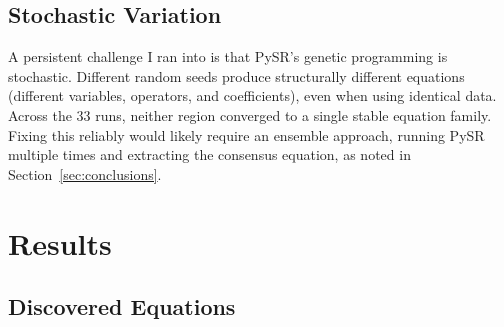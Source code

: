 \documentclass[12pt, a4paper]{article}
\begin{document}


\subsection{Stochastic Variation}

A persistent challenge I ran into is that PySR's genetic programming is stochastic. Different random seeds produce structurally different equations (different variables, operators, and coefficients), even when using identical data. Across the 33 runs, neither region converged to a single stable equation family. Fixing this reliably would likely require an ensemble approach, running PySR multiple times and extracting the consensus equation, as noted in Section~\ref{sec:conclusions}.

\section{Results}
\label{sec:results}

\subsection{Discovered Equations}
\end{document}
